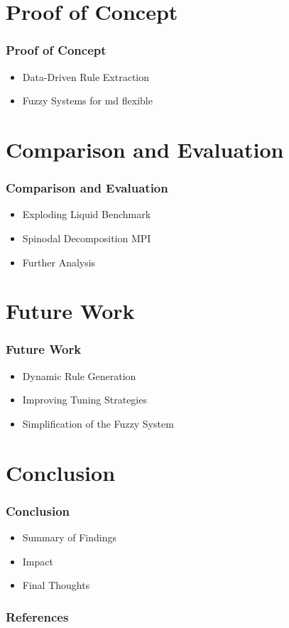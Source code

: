 \documentclass[
	10pt,
	t		%
]{beamer}
\begin{document}
\section{Proof of Concept}
\begin{frame}
	\frametitle{Proof of Concept}
	\begin{itemize}
		\item Data-Driven Rule Extraction
		\item Fuzzy Systems for md flexible
	\end{itemize}
\end{frame}

\section{Comparison and Evaluation}
\begin{frame}
	\frametitle{Comparison and Evaluation}
	\begin{itemize}
		\item Exploding Liquid Benchmark
		\item Spinodal Decomposition MPI
		\item Further Analysis
	\end{itemize}
\end{frame}

\section{Future Work}
\begin{frame}
	\frametitle{Future Work}
	\begin{itemize}
		\item Dynamic Rule Generation
		\item Improving Tuning Strategies
		\item Simplification of the Fuzzy System
	\end{itemize}
\end{frame}

\section{Conclusion}
\begin{frame}
	\frametitle{Conclusion}
	\begin{itemize}
		\item Summary of Findings
		\item Impact
		\item Final Thoughts
	\end{itemize}
\end{frame}

\begin{frame}[allowframebreaks]
	\frametitle{References}
	
	
\end{frame}
\end{document}
